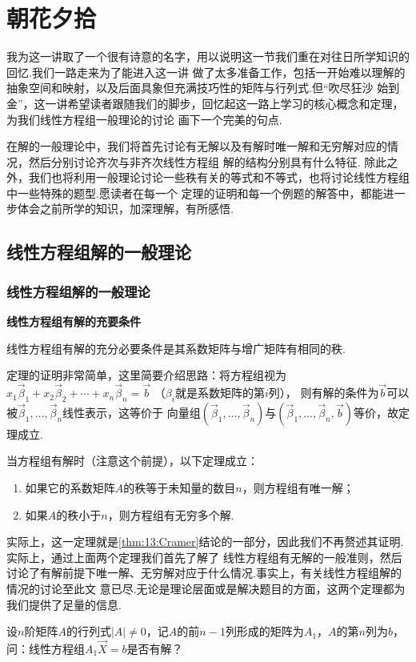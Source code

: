 \chapter{朝花夕拾}

我为这一讲取了一个很有诗意的名字，用以说明这一节我们重在对往日所学知识的回忆.我们一路走来为了能进入这一讲
做了太多准备工作，包括一开始难以理解的抽象空间和映射，以及后面具象但充满技巧性的矩阵与行列式.但``吹尽狂沙
始到金''，这一讲希望读者跟随我们的脚步，回忆起这一路上学习的核心概念和定理，为我们线性方程组一般理论的讨论
画下一个完美的句点.

在解的一般理论中，我们将首先讨论有无解以及有解时唯一解和无穷解对应的情况，然后分别讨论齐次与非齐次线性方程组
解的结构分别具有什么特征.
除此之外，我们也将利用一般理论讨论一些秩有关的等式和不等式，也将讨论线性方程组中一些特殊的题型.愿读者在每一个
定理的证明和每一个例题的解答中，都能进一步体会之前所学的知识，加深理解，有所感悟.

\section{线性方程组解的一般理论}
\subsection{线性方程组解的一般理论}
\begin{theorem} \textbf{\heiti 线性方程组有解的充要条件} \label{thm:15:有解条件}

    线性方程组有解的充分必要条件是其系数矩阵与增广矩阵有相同的秩.
\end{theorem}
定理的证明非常简单，这里简要介绍思路：将方程组视为$x_1\vec{\beta}_1+x_2\vec{\beta}_2+\cdots+x_n\vec{\beta}_n=\vec{b}$
（$\beta_i$就是系数矩阵的第$i$列），
则有解的条件为$\vec{b}$可以被$\vec{\beta}_1,\ldots,\vec{\beta}_n$线性表示，这等价于
向量组$(\vec{\beta}_1,\ldots,\vec{\beta}_n)$与$(\vec{\beta}_1,\ldots,\vec{\beta}_n,\vec{b})$等价，故定理成立.

\begin{theorem} \label{thm:15:方程组解}
    当方程组有解时（注意这个前提），以下定理成立：
    \begin{enumerate}
        \item 如果它的系数矩阵$A$的秩等于未知量的数目$n$，则方程组有唯一解；

        \item 如果$A$的秩小于$n$，则方程组有无穷多个解.
    \end{enumerate}
\end{theorem}
实际上，这一定理就是\autoref{thm:13:Cramer}结论的一部分，因此我们不再赘述其证明.实际上，通过上面两个定理我们首先了解了
线性方程组有无解的一般准则，然后讨论了有解前提下唯一解、无穷解对应于什么情况.事实上，有关线性方程组解的情况的讨论至此文
意已尽.无论是理论层面或是解决题目的方面，这两个定理都为我们提供了足量的信息.
\begin{example}
    设$n$阶矩阵$A$的行列式$|A|\neq 0$，记$A$的前$n-1$列形成的矩阵为$A_1$，$A$的第$n$列为$b$，
    问：线性方程组$A_1\vec{X}=b$是否有解？
\end{example}
\begin{solution}

\end{solution}


